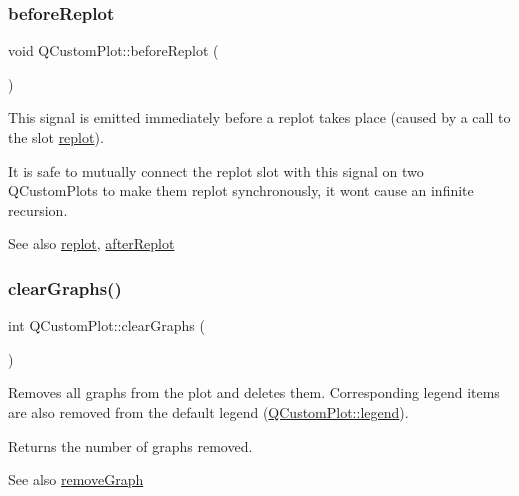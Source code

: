 \subsubsection{\texorpdfstring{before\+Replot}{beforeReplot}}
{\footnotesize\ttfamily void Q\+Custom\+Plot\+::before\+Replot (\begin{DoxyParamCaption}{ }\end{DoxyParamCaption})\hspace{0.3cm}{\ttfamily [signal]}}

This signal is emitted immediately before a replot takes place (caused by a call to the slot \hyperlink{classQCustomPlot_aa4bfe7d70dbe67e81d877819b75ab9af}{replot}).

It is safe to mutually connect the replot slot with this signal on two Q\+Custom\+Plots to make them replot synchronously, it won\textquotesingle{}t cause an infinite recursion.

\begin{DoxySeeAlso}{See also}
\hyperlink{classQCustomPlot_aa4bfe7d70dbe67e81d877819b75ab9af}{replot}, \hyperlink{classQCustomPlot_a6f4fa624af060bc5919c5f266cf426a0}{after\+Replot} 
\end{DoxySeeAlso}
\mbox{\label{classQCustomPlot_ab0f3abff2d2f7df3668b5836f39207fa}} 
\subsubsection{\texorpdfstring{clear\+Graphs()}{clearGraphs()}}
{\footnotesize\ttfamily int Q\+Custom\+Plot\+::clear\+Graphs (\begin{DoxyParamCaption}{ }\end{DoxyParamCaption})}

Removes all graphs from the plot and deletes them. Corresponding legend items are also removed from the default legend (\hyperlink{classQCustomPlot_a4eadcd237dc6a09938b68b16877fa6af}{Q\+Custom\+Plot\+::legend}).

Returns the number of graphs removed.

\begin{DoxySeeAlso}{See also}
\hyperlink{classQCustomPlot_a903561be895fb6528a770d66ac5e6713}{remove\+Graph} 
\end{DoxySeeAlso}
\mbox{\label{classQCustomPlot_abdfd07d4f0591d0cf967f85013fd3645}} 
